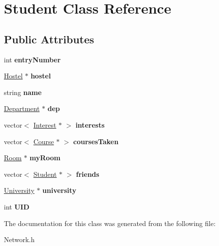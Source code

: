 \hypertarget{classStudent}{\section{\-Student \-Class \-Reference}
\label{classStudent}
}
\subsection*{\-Public \-Attributes}
\begin{DoxyCompactItemize}
\item 
\hypertarget{classStudent_aed9cb8024b480d9223ec75f09e2fa76c}{int {\bfseries entry\-Number}}\label{classStudent_aed9cb8024b480d9223ec75f09e2fa76c}

\item 
\hypertarget{classStudent_a2c7885100d3a3b5d3acc6f9a56b6917e}{\hyperlink{classHostel}{\-Hostel} $\ast$ {\bfseries hostel}}\label{classStudent_a2c7885100d3a3b5d3acc6f9a56b6917e}

\item 
\hypertarget{classStudent_a671f6b115a158653a0f0bece34ea0667}{string {\bfseries name}}\label{classStudent_a671f6b115a158653a0f0bece34ea0667}

\item 
\hypertarget{classStudent_ac6487556474bbf89bed8a59257744e9c}{\hyperlink{classDepartment}{\-Department} $\ast$ {\bfseries dep}}\label{classStudent_ac6487556474bbf89bed8a59257744e9c}

\item 
\hypertarget{classStudent_adf8a6f5b72fb5556ffa37571b48af43b}{vector$<$ \hyperlink{classInterest}{\-Interest} $\ast$ $>$ {\bfseries interests}}\label{classStudent_adf8a6f5b72fb5556ffa37571b48af43b}

\item 
\hypertarget{classStudent_ab3c33d49ba1a7cc039b0db76adf335ec}{vector$<$ \hyperlink{classCourse}{\-Course} $\ast$ $>$ {\bfseries courses\-Taken}}\label{classStudent_ab3c33d49ba1a7cc039b0db76adf335ec}

\item 
\hypertarget{classStudent_a4495422585e35f50652a0ca444a4fb7c}{\hyperlink{classRoom}{\-Room} $\ast$ {\bfseries my\-Room}}\label{classStudent_a4495422585e35f50652a0ca444a4fb7c}

\item 
\hypertarget{classStudent_a4b2b88778c96700c3979dcda9c1b8b68}{vector$<$ \hyperlink{classStudent}{\-Student} $\ast$ $>$ {\bfseries friends}}\label{classStudent_a4b2b88778c96700c3979dcda9c1b8b68}

\item 
\hypertarget{classStudent_a79d3d7b2abc391280a6b41a48e71745f}{\hyperlink{classUniversity}{\-University} $\ast$ {\bfseries university}}\label{classStudent_a79d3d7b2abc391280a6b41a48e71745f}

\item 
\hypertarget{classStudent_a3792b6b72bea87aad859c970cfae7659}{int {\bfseries \-U\-I\-D}}\label{classStudent_a3792b6b72bea87aad859c970cfae7659}

\end{DoxyCompactItemize}


\-The documentation for this class was generated from the following file\-:\begin{DoxyCompactItemize}
\item 
\-Network.\-h\end{DoxyCompactItemize}

